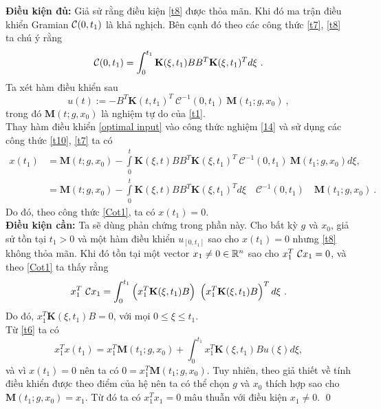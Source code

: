 \begin{cm}
\textbf{Điều kiện đủ:} Giả sử rằng điều kiện \eqref{t8} được thỏa mãn. Khi đó ma trận điều khiển Gramian $\mathcal{C}(0,t_1)$ là khả nghịch. Bên cạnh đó theo các công thức \eqref{t7}, \eqref{t8} ta chú ý rằng
%
\begin{equation}\label{Cot1}
\mathcal{C}(0,t_1) = \int^{t_1}_0  \mathbf{K}(\xi,t_1) B B^T \mathbf{K}(\xi,t_1)^T d\xi \ .
\end{equation}
%
Ta xét hàm điều khiển sau
\begin{equation}\label{optimal input}
u(t) :=-B^T \mathbf{K}(t,t_1)^T \  \mathcal{C}^{-1}(0,t_1) \ \mathbf{M}(t_1;g,x_0) \ , 
\end{equation}     
trong đó $\mathbf{M}(t;g,x_0)$ là nghiệm tự do của \eqref{t1}. \\
Thay hàm điều khiển \eqref{optimal input} vào công thức nghiệm \eqref{14} và sử dụng các công thức \eqref{t10}, \eqref{t7} ta có 
%
\begin{align*}
x(t_1) & =\mathbf{M}(t;g,x_0) - \int\limits^t_0\mathbf{K}(\xi,t)B 
B^T \mathbf{K}(\xi,t_1)^T \  \mathcal{C}^{-1}(0,t_1) \ \mathbf{M}(t_1;g,x_0) d\xi , \\ 
& = \mathbf{M}(t;g,x_0) -   \int\limits^t_0\mathbf{K}(\xi,t)B 
B^T \mathbf{K}(\xi,t_1)^T d\xi \quad  \mathcal{C}^{-1}(0,t_1) \quad \mathbf{M}(t_1;g,x_0) \ .
\end{align*}
%
Do đó, theo công thức \eqref{Cot1}, ta có $x(t_1)=0$.\\
%
\textbf{Điều kiện cần:} Ta sẽ dùng phản chứng trong phần này. Cho bất kỳ $g$ và $x_0$, giả sử tồn tại $t_1>0$ và một hàm điều khiển $u_{[0,t_1]}$ sao cho $x(t_1)=0$ nhưng \eqref{t8} không thỏa mãn. 
Khi đó tồn tại một vector $x_1 \not= 0 \in \mathbb{R}^n$ sao cho $x^T_1 \ \mathcal{C} x_1 = 0$, và theo \eqref{Cot1} ta thấy 
rằng
%
\[
x^T_1 \ \mathcal{C} x_1 = \int^{t_1}_0  \left( x^T_1 \mathbf{K}(\xi,t_1) B \right) \ \left( x^T_1 \mathbf{K}(\xi,t_1) B \right)^T d\xi \ . 
\]
%
Do đó, $x^T_1\mathbf{K}(\xi,t_1)B=0$, với mọi $0\leq \xi \leq t_1$. \\
Từ \eqref{t6} ta có
	\begin{equation}\label{t12}
	x^T_1x(t_1)=x^T_1\mathbf{M}(t_1;g,x_0)+\int^{t_1}_0x^T_1\mathbf{K}(\xi,t_1)B u(\xi)d\xi,
	\end{equation}
	và vì $x(t_1) = 0$ nên ta có $0=x^T_1\mathbf{M}(t_1;g,x_0)$. Tuy nhiên, theo giả thiết về tính điều khiển được theo điểm của hệ nên ta có thể chọn $g$ và $x_0$ thích hợp sao cho $\mathbf{M}(t_1;g,x_0)=x_1$. Từ đó ta có $x^T_1x_1=0$ mâu thuẫn với điều kiện $x_1\neq 0$. \qed
\end{cm}

